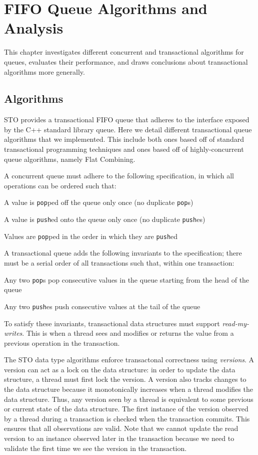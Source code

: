 \section{FIFO Queue Algorithms and Analysis}

This chapter investigates different concurrent and transactional algorithms for queues, evaluates their performance, and draws conclusions about transactional algorithms more generally.


\subsection{Algorithms}

STO provides a transactional FIFO queue that adheres to the interface exposed by the C++ standard library queue. Here we detail different transactional queue algorithms that we implemented. This include both ones based off of standard transactional programming techniques and ones based off of highly-concurrent queue algorithms, namely Flat Combining.

A concurrent queue must adhere to the following specification, in which all operations can be ordered such that:
\begin{bullets}
    \item A value is \texttt{pop}ped off the queue only once (no duplicate \texttt{pop}s)
    \item A value is \texttt{push}ed onto the queue only once (no duplicate \texttt{push}es)
    \item Values are \texttt{pop}ped in the order in which they are \texttt{push}ed
\end{bullets}

A transactional queue adds the following invariants to the specification; there must be a serial order of all transactions such that, within one transaction:
\begin{bullets}
    \item Any two \texttt{pop}s pop consecutive values in the queue starting from the head of the queue 
    \item Any two \texttt{push}es push consecutive values at the tail of the queue
\end{bullets}

To satisfy these invariants, transactional data structures must support \emph{read-my-writes}. This is when a thread sees and modifies or returns the value from a previous operation in the transaction.

The STO data type algorithms enforce transactonal correctness using \emph{versions}. A version can act as a lock on the data structure: in order to update the data structure, a thread must first lock the version. A version also tracks changes to the data structure because it monotonically increases when a thread modifies the data structure. Thus, any version seen by a thread is equivalent to some previous or current state of the data structure. The first instance of the version observed by a thread during a transaction is checked when the transaction commits. This ensures that all observations are valid. Note that we cannot update the read version to an instance observed later in the transaction because we need to validate the first time we see the version in the transaction. 


